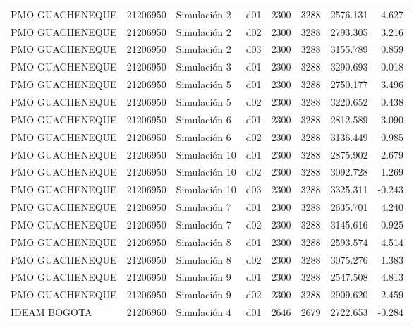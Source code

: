 \begin{landscape}
\begin{longtable}{lrlp{2cm}p{2cm}p{3cm}p{2cm}r}
         PMO GUACHENEQUE &  21206950 &   Simulación 2 &   d01 &      2300 &     3288 &  2576.131 &     4.627 \\
         PMO GUACHENEQUE &  21206950 &   Simulación 2 &   d02 &      2300 &     3288 &  2793.305 &     3.216 \\
         PMO GUACHENEQUE &  21206950 &   Simulación 2 &   d03 &      2300 &     3288 &  3155.789 &     0.859 \\
         PMO GUACHENEQUE &  21206950 &   Simulación 3 &   d01 &      2300 &     3288 &  3290.693 &    -0.018 \\
         PMO GUACHENEQUE &  21206950 &   Simulación 5 &   d01 &      2300 &     3288 &  2750.177 &     3.496 \\
         PMO GUACHENEQUE &  21206950 &   Simulación 5 &   d02 &      2300 &     3288 &  3220.652 &     0.438 \\
         PMO GUACHENEQUE &  21206950 &   Simulación 6 &   d01 &      2300 &     3288 &  2812.589 &     3.090 \\
         PMO GUACHENEQUE &  21206950 &   Simulación 6 &   d02 &      2300 &     3288 &  3136.449 &     0.985 \\
         PMO GUACHENEQUE &  21206950 &  Simulación 10 &   d01 &      2300 &     3288 &  2875.902 &     2.679 \\
         PMO GUACHENEQUE &  21206950 &  Simulación 10 &   d02 &      2300 &     3288 &  3092.728 &     1.269 \\
         PMO GUACHENEQUE &  21206950 &  Simulación 10 &   d03 &      2300 &     3288 &  3325.311 &    -0.243 \\
         PMO GUACHENEQUE &  21206950 &   Simulación 7 &   d01 &      2300 &     3288 &  2635.701 &     4.240 \\
         PMO GUACHENEQUE &  21206950 &   Simulación 7 &   d02 &      2300 &     3288 &  3145.616 &     0.925 \\
         PMO GUACHENEQUE &  21206950 &   Simulación 8 &   d01 &      2300 &     3288 &  2593.574 &     4.514 \\
         PMO GUACHENEQUE &  21206950 &   Simulación 8 &   d02 &      2300 &     3288 &  3075.276 &     1.383 \\
         PMO GUACHENEQUE &  21206950 &   Simulación 9 &   d01 &      2300 &     3288 &  2547.508 &     4.813 \\
         PMO GUACHENEQUE &  21206950 &   Simulación 9 &   d02 &      2300 &     3288 &  2909.620 &     2.459 \\
            IDEAM BOGOTA &  21206960 &   Simulación 4 &   d01 &      2646 &     2679 &  2722.653 &    -0.284 \\

\end{longtable}
\end{landscape}
